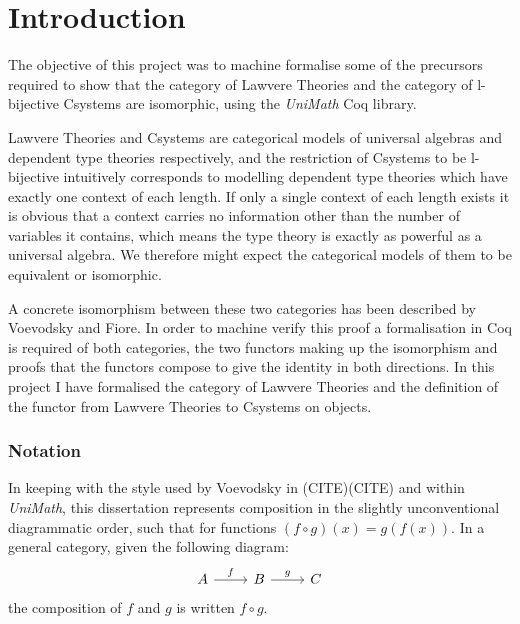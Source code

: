 \chapter{Introduction}
The objective of this project was to machine formalise some of the precursors
required to show that the category of Lawvere Theories and the category of
l-bijective Csystems are isomorphic, using the \textit{UniMath} Coq library. 

Lawvere Theories and Csystems are categorical models of
universal algebras and dependent type theories respectively, and the restriction
of Csystems to be l-bijective intuitively corresponds to modelling dependent
type theories which have exactly one context of each length. If only a single
context of each length exists it is obvious that a context carries no
information other than the number of variables it contains, which means the type
theory is exactly as powerful as a universal algebra. We therefore might expect
the categorical models of them to be equivalent or isomorphic.

A concrete isomorphism between these two categories has been described by
Voevodsky and Fiore. In order to machine verify this proof a formalisation in
Coq is required of both categories, the two functors making up the isomorphism
and proofs that the functors compose to give the identity in both directions. In
this project I have formalised the category of Lawvere Theories and the
definition of the functor from Lawvere Theories to Csystems on objects.

\subsection*{Notation}
In keeping with the style used by Voevodsky in (CITE)(CITE) and within
\textit{UniMath}, this dissertation represents composition in the slightly
unconventional diagrammatic order, such that for functions $(f\circ g)(x) =
g(f(x))$. In a general category, given the following diagram:
\[
\begin{tikzcd}
    A\ar[r,"f"]&B\ar[r,"g"]&C
\end{tikzcd}
\]
the composition of $f$ and $g$ is written $f\circ g$.
